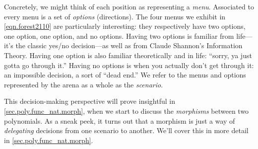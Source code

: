 \documentclass[Book-Poly]{subfiles}
\begin{document}
Concretely, we might think of each position as representing a \emph{menu}.
Associated to every menu is a set of \emph{options} (directions).
The four menus we exhibit in \eqref{eqn.forest2110} are particularly interesting: they respectively have two options, one option, one option, and no options.
Having two options is familiar from life---it's the classic yes/no decision---as well as from Claude Shannon's Information Theory.
Having one option is also familiar theoretically and in life: ``sorry, ya just gotta go through it.''
Having no options is when you actually don't get through it: an impossible decision, a sort of ``dead end.''
We refer to the menus and options represented by the arena as a whole as the \emph{scenario}. %

This decision-making perspective will prove insightful in \cref{sec.poly.func_nat.morph}, when we start to discuss the \emph{morphisms} between two polynomials.
As a sneak peek, it turns out that a morphism is just a way of \emph{delegating} decisions from one scenario to another.
We'll cover this in more detail in \cref{sec.poly.func_nat.morph}.
\end{document}
